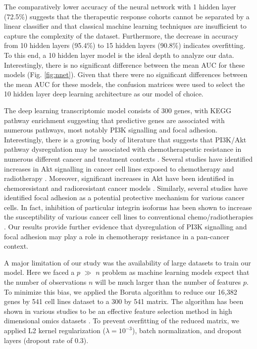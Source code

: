 \documentclass[10pt, letterpaper]{article}
\begin{document}
\begin{multicols*}{2}
The comparatively lower accuracy of the neural network with 1 hidden layer (72.5\%) suggests that the therapeutic response cohorts cannot be separated by a linear classifier and that classical machine learning techniques are insufficient to capture the complexity of the dataset. Furthermore, the decrease in accuracy from 10 hidden layers (95.4\%) to 15 hidden layers (90.8\%) indicates overfitting. To this end, a 10 hidden layer model is the ideal depth to analyze our data. Interestingly, there is no significant difference between the mean AUC for these models (Fig. \ref{fig:nnet}). Given that there were no significant differences between the mean AUC for these models, the confusion matrices were used to select the 10 hidden layer deep learning architecture as our model of choice.

The deep learning transcriptomic model consists of 300 genes, with KEGG pathway enrichment suggesting that predictive genes are associated with numerous pathways, most notably PI3K signalling and focal adhesion. Interestingly, there is a growing body of literature that suggests that PI3K/Akt pathway dysregulation may be associated with chemotherapeutic resistance in numerous different cancer and treatment contexts \cite{huang_2009}. Several studies have identified increases in Akt signalling in cancer cell lines exposed to chemotherapy and radiotherapy \cite{mapk, wort, phos}. Moreover, significant increases in Akt have been identified in chemoresistant and radioresistant cancer models \cite{cholangio}. Similarly, several studies have identified focal adhesion as a potential protective mechanism for various cancer cells. In fact, inhibition of particular integrin isoforms has been shown to increase the susceptibility of various cancer cell lines to conventional chemo/radiotherapies \cite{focal_adhesion}. Our results provide further evidence that dysregulation of PI3K signalling and focal adhesion may play a role in chemotherapy resistance in a pan-cancer context.

A major limitation of our study was the availability of large datasets to train our model. Here we faced a $p$ $\gg$ $n$ problem as machine learning models expect that the number of observations $n$ will be much larger than the number of features $p$. To minimize this bias, we applied the Boruta algorithm to reduce our 16,382 genes by 541 cell lines dataset to a 300 by 541 matrix. The algorithm has been shown in various studies to be an effective feature selection method in high dimensional omics datasets \cite{boruta}. To prevent overfitting of the reduced matrix, we applied L2 kernel regularization ($\lambda=10^{-3}$), batch normalization, and dropout layers (dropout rate of 0.3).


\end{multicols*}
\end{document}

